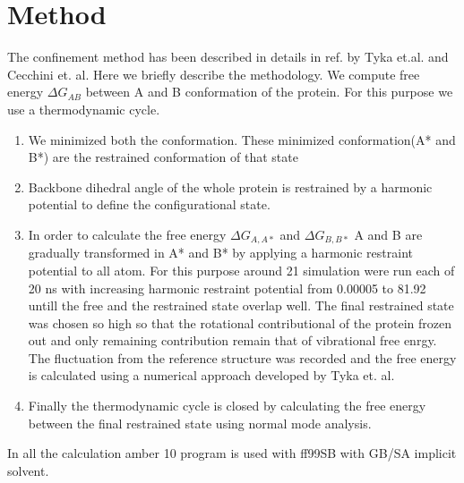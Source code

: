 \documentclass[12pt]{article}
\begin{document}
\section{Method}

The confinement method has been described in details in ref. by Tyka et.al. and Cecchini et. al.
Here we briefly describe the methodology.  We compute free energy $\Delta G_{AB}$ between A and B
conformation of the protein. For this purpose we use a thermodynamic cycle.

\begin{enumerate}

\item  We minimized both the conformation. These minimized conformation(A* and B*) are the
    restrained conformation of that state

\item Backbone dihedral angle of the whole protein is restrained by a harmonic potential to define
    the configurational state.

\item  In order to calculate the free energy $\Delta G_{A,A*}$ and  $\Delta G_{B,B*}$ A and B are
    gradually transformed in A* and B* by applying a harmonic restraint potential to all atom. For
    this purpose around 21 simulation were run each of 20 ns with increasing harmonic restraint
    potential from 0.00005 to 81.92 untill the free and the restrained state overlap well. The final
    restrained state was chosen so high so that the rotational contributional of the protein frozen
    out and only remaining contribution remain that of vibrational free enrgy. The fluctuation from
    the reference structure was recorded and the free energy is calculated using a numerical
    approach developed by Tyka et. al.

\item  Finally the thermodynamic cycle is closed by calculating the free energy between the final
    restrained state using normal mode analysis.

\end{enumerate}

In all the calculation amber 10 program is used with ff99SB with GB/SA implicit solvent.
\end{document}
